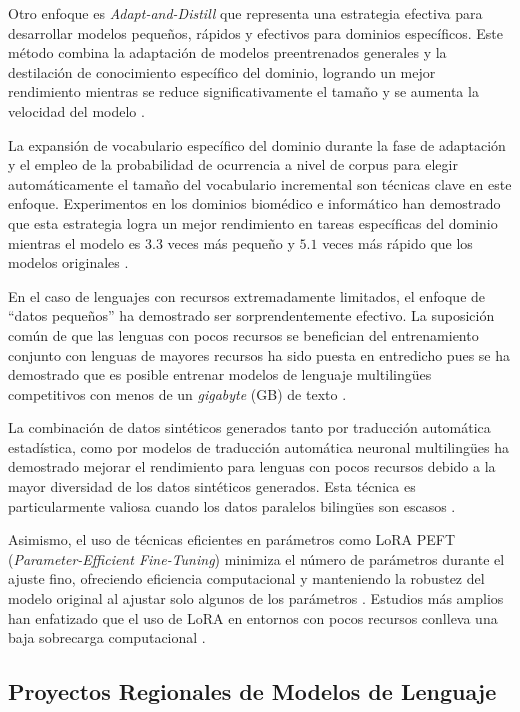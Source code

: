 \documentclass[10pt,twoside]{rcmart} %
\begin{document}
Otro enfoque es \textit{Adapt-and-Distill} que representa una estrategia efectiva para desarrollar modelos pequeños, rápidos y efectivos para dominios específicos. Este método combina la adaptación de modelos preentrenados generales y la destilación de conocimiento específico del dominio, logrando un mejor rendimiento mientras se reduce significativamente el tamaño y se aumenta la velocidad del modelo \cite{yao2021adapt}.

La expansión de vocabulario específico del dominio durante la fase de adaptación y el empleo de la probabilidad de ocurrencia a nivel de corpus para elegir automáticamente el tamaño del vocabulario incremental son técnicas clave en este enfoque. Experimentos en los dominios biomédico e informático han demostrado que esta estrategia logra un mejor rendimiento en tareas específicas del dominio mientras el modelo es $3.3$ veces más pequeño y $5.1$ veces más rápido que los modelos originales \cite{yao2021adapt}.

En el caso de lenguajes con recursos extremadamente limitados, el enfoque de ``datos pequeños'' ha demostrado ser sorprendentemente efectivo. La suposición común de que las lenguas con pocos recursos se benefician del entrenamiento conjunto con lenguas de mayores recursos ha sido puesta en entredicho pues se ha demostrado que es posible entrenar modelos de lenguaje multilingües competitivos con menos de un \textit{gigabyte} (GB) de texto \cite{ogueji2021small}.

La combinación de datos sintéticos generados tanto por traducción automática estadística, como por modelos de traducción automática neuronal multilingües ha demostrado mejorar el rendimiento para lenguas con pocos recursos debido a la mayor diversidad de los datos sintéticos generados. Esta técnica es particularmente valiosa cuando los datos paralelos bilingües son escasos \cite{shu2024transcending}.

Asimismo, el uso de técnicas eficientes en parámetros como LoRA PEFT (\textit{Parameter-Efficient Fine-Tuning}) minimiza el número de parámetros durante el ajuste fino, ofreciendo eficiencia computacional y manteniendo la robustez del modelo original al ajustar solo algunos de los parámetros \cite{chavan2023one}. Estudios más amplios han enfatizado que el uso de LoRA en entornos con pocos recursos conlleva una baja sobrecarga computacional \cite{ellison2025lora, chen2025lora}.

\subsection{Proyectos Regionales de Modelos de Lenguaje}
\end{document}
